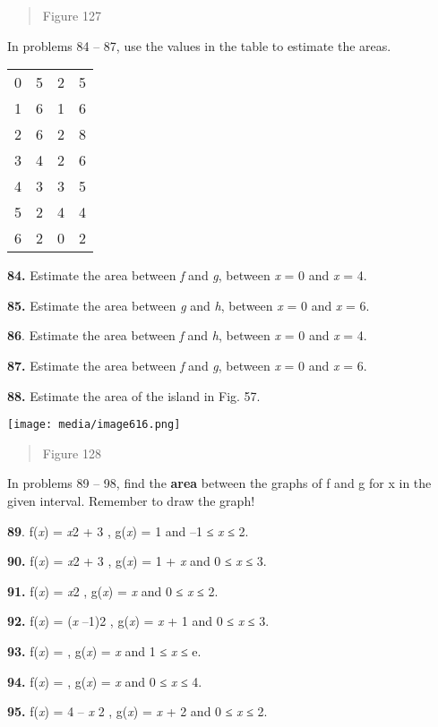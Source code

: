 \begin{quote}
Figure 127
\end{quote}

In problems 84 -- 87, use the values in the table to estimate the areas.

\begin{longtable}[]{@{}llll@{}}
\toprule
0 & 5 & 2 & 5\tabularnewline
1 & 6 & 1 & 6\tabularnewline
2 & 6 & 2 & 8\tabularnewline
3 & 4 & 2 & 6\tabularnewline
4 & 3 & 3 & 5\tabularnewline
5 & 2 & 4 & 4\tabularnewline
6 & 2 & 0 & 2\tabularnewline
\bottomrule
\end{longtable}

\textbf{84.} Estimate the area between \emph{f} and \emph{g}, between
\emph{x} = 0 and \emph{x} = 4.

\textbf{85.} Estimate the area between \emph{g} and \emph{h}, between
\emph{x} = 0 and \emph{x} = 6.

\textbf{86}. Estimate the area between \emph{f} and \emph{h}, between
\emph{x} = 0 and \emph{x} = 4.

\textbf{87.} Estimate the area between \emph{f} and \emph{g}, between
\emph{x} = 0 and \emph{x} = 6.

\textbf{88.} Estimate the area of the island in Fig. 57.

\texttt{[image: media/image616.png]}

\begin{quote}
Figure 128
\end{quote}

In problems 89 -- 98, find the \textbf{area} between the graphs of f and
g for x in the given interval. Remember to draw the graph!

\textbf{89}. f(\emph{x}) = \emph{x}2 + 3 , g(\emph{x}) = 1 and --1 ≤
\emph{x} ≤ 2.

\textbf{90.} f(\emph{x}) = \emph{x}2 + 3 , g(\emph{x}) = 1 + \emph{x}
and 0 ≤ \emph{x} ≤ 3.

\textbf{91.} f(\emph{x}) = \emph{x}2 , g(\emph{x}) = \emph{x} and 0 ≤
\emph{x} ≤ 2.

\textbf{92.} f(\emph{x}) = (\emph{x} --1)2 , g(\emph{x}) = \emph{x} + 1
and 0 ≤ \emph{x} ≤ 3.

\textbf{93.} f(\emph{x}) = , g(\emph{x}) = \emph{x} and 1 ≤ \emph{x} ≤
e.

\textbf{94.} f(\emph{x}) = , g(\emph{x}) = \emph{x} and 0 ≤ \emph{x} ≤
4.

\textbf{95.} f(\emph{x}) = 4 -- \emph{x} 2 , g(\emph{x}) = \emph{x} + 2
and 0 ≤ \emph{x} ≤ 2.

